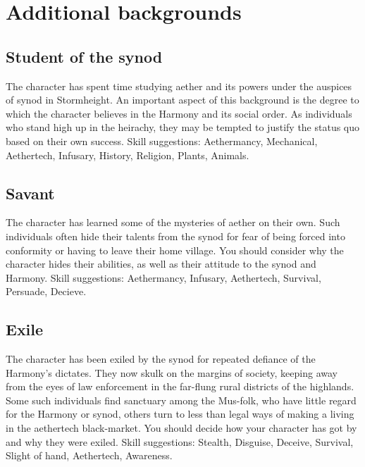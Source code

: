 \documentclass[a4paper,11pt,oneside]{book}
\begin{document}
\section{Additional backgrounds}

\subsection{Student of the synod}
The character has spent time studying aether and its powers under the auspices of synod in Stormheight. An important aspect of this background is the degree to which the character believes in the Harmony and its social order. As individuals who stand high up in the heirachy, they may be tempted to justify the status quo based on their own success. Skill suggestions: Aethermancy, Mechanical, Aethertech, Infusary, History, Religion, Plants, Animals.

\subsection{Savant}
The character has learned some of the mysteries of aether on their own. Such individuals often hide their talents from the synod for fear of being forced into conformity or having to leave their home village. You should consider why the character hides their abilities, as well as their attitude to the synod and Harmony. Skill suggestions: Aethermancy, Infusary, Aethertech, Survival, Persuade, Decieve. 

\subsection{Exile}
The character has been exiled by the synod for repeated defiance of the Harmony's dictates. They now skulk on the margins of society, keeping away from the eyes of law enforcement in the far-flung rural districts of the highlands. Some such individuals find sanctuary among the Mus-folk, who have little regard for the Harmony or synod, others turn to less than legal ways of making a living in the aethertech black-market. You should decide how your character has got by and why they were exiled. Skill suggestions: Stealth, Disguise, Deceive, Survival, Slight of hand, Aethertech, Awareness.  
\end{document}
